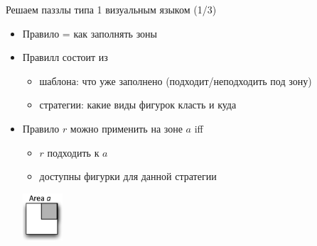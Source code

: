 \documentclass[aspectratio=169
  , xcolor={svgnames}
  , hyperref={ colorlinks,citecolor=DeepPink4
             , linkcolor=DarkRed,urlcolor=DarkBlue}
  , russian
  ]{beamer}
\theoremstyle{exerciseStyle1}
\begin{document}
\begin{frame}[fragile]{Решаем паззлы типа 1 визуальным языком (1/3)}
\begin{minipage}{.48\textwidth}
\begin{itemize}
\item Правило = как заполнять зоны
\item Правилл состоит из
\begin{itemize}
\item шаблона: что уже заполнено (подходит/неподходить под зону)
\item стратегии: какие виды фигурок класть и куда 
\end{itemize}
\item Правило $r$ можно применить на зоне $a$ iff
\begin{itemize}
\item  $r$ подходить к $a$
\item  доступны фигурки для данной стратегии 
\end{itemize}
\includegraphics[width=1.5cm]{figures/area-a}
\end{itemize}
\end{minipage}
\end{frame}
\end{document}
